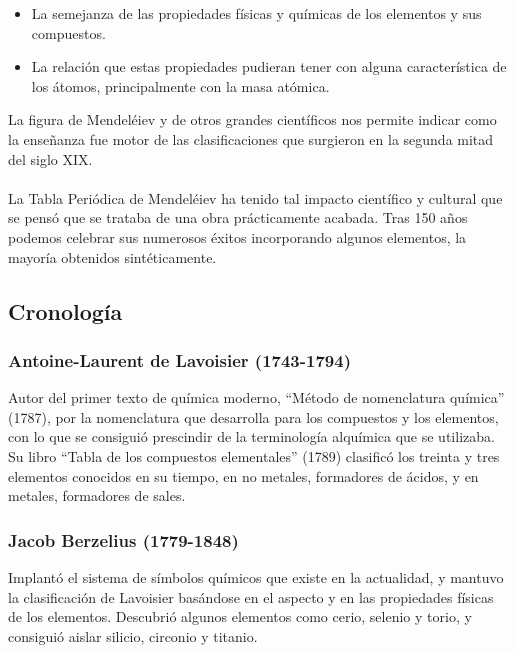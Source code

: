 \documentclass[12pt]{article}
\begin{document}
               \begin{itemize}
                    \item La semejanza de las propiedades físicas y químicas de los elementos y sus compuestos.
                    \item La relación que estas propiedades pudieran tener con alguna característica de los átomos, principalmente con la masa atómica.
               \end{itemize}

               La figura de Mendeléiev y de otros grandes científicos nos permite indicar como la enseñanza fue motor de las clasificaciones que surgieron en la segunda mitad del siglo XIX.\\\\
               La Tabla Periódica de Mendeléiev ha tenido tal impacto científico y cultural que se pensó que se trataba de una obra prácticamente acabada. Tras 150 años podemos celebrar sus numerosos éxitos incorporando algunos elementos, la mayoría obtenidos sintéticamente.
             
               \subsection{Cronología}\label{sec:Cronología}
                    \subsubsection{Antoine-Laurent de Lavoisier (1743-1794)}\label{sec:Antoine-Laurent de Lavoisier (1743-1794)}
                         Autor del primer texto de química moderno, “Método de nomenclatura química” (1787), por la nomenclatura que desarrolla para los compuestos y los elementos, con lo que se consiguió prescindir de la terminología alquímica que se utilizaba.\\
                         Su libro “Tabla de los compuestos elementales” (1789) clasificó los treinta y tres elementos conocidos en su tiempo, en no metales, formadores de ácidos, y en metales, formadores de sales.
                    
                    \subsubsection{Jacob Berzelius (1779-1848)}\label{sec:Jacob Berzelius (1779-1848)}
                         Implantó el sistema de símbolos químicos que existe en la actualidad, y mantuvo la clasificación de Lavoisier basándose en el aspecto y en las propiedades físicas de los elementos. Descubrió algunos elementos como cerio, selenio y torio, y consiguió aislar silicio, circonio y titanio.
\end{document}
